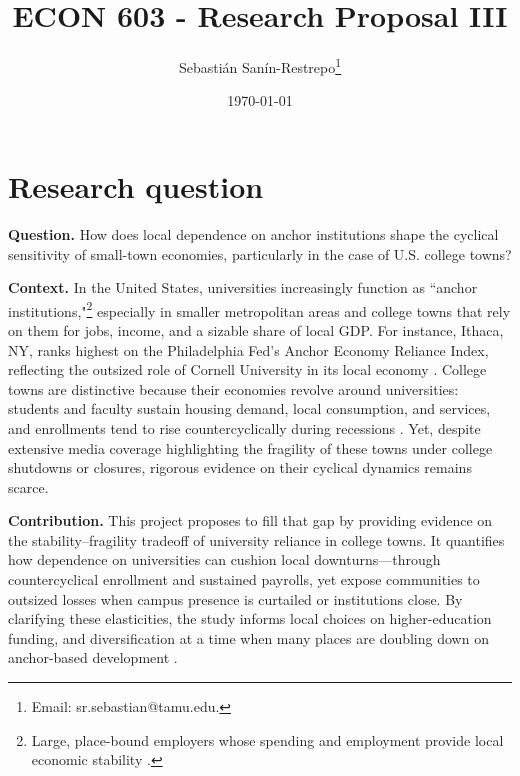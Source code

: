 



\title{\Large \textbf{ECON 603 - Research Proposal III}}

\author{Sebasti\'an San\'in-Restrepo\thanks{Email: sr.sebastian@tamu.edu.}} 
\date{\today}

\maketitle
\thispagestyle{empty} 
\doublespacing
\thispagestyle{empty} 

\vspace{-10mm}

\doublespacing

\section{ Research question}

\noindent \textbf{Question.} How does local dependence on anchor institutions shape the cyclical sensitivity of small-town economies, particularly in the case of U.S. college towns?

\noindent\textbf{Context.} In the United States, universities increasingly function as ``anchor institutions,"\footnote{Large, place-bound employers whose spending and employment provide local economic stability \citep{Harker2024AnchorReliance,Saxenian1994RegionalAdvantage}.} especially in smaller metropolitan areas and college towns that rely on them for jobs, income, and a sizable share of local GDP. For instance, Ithaca, NY, ranks highest on the Philadelphia Fed’s Anchor Economy Reliance Index, reflecting the outsized role of Cornell University in its local economy \citep{Harker2024AnchorReliance}. College towns are distinctive because their economies revolve around universities: students and faculty sustain housing demand, local consumption, and services, and enrollments tend to rise countercyclically during recessions \citep{BoundTurner2007CohortCrowding}. Yet, despite extensive media coverage highlighting the fragility of these towns under college shutdowns or closures, rigorous evidence on their cyclical dynamics remains scarce.

\noindent\textbf{Contribution.} This project proposes to fill that gap by providing evidence on the stability–fragility tradeoff of university reliance in college towns. It quantifies how dependence on universities can cushion local downturns—through countercyclical enrollment and sustained payrolls, yet expose communities to outsized losses when campus presence is curtailed or institutions close. By clarifying these elasticities, the study informs local choices on higher-education funding, and diversification at a time when many places are doubling down on anchor-based development \citep{Harker2024AnchorReliance}.

